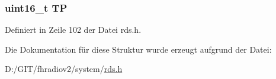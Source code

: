 \subsubsection[{T\+P}]{\setlength{\rightskip}{0pt plus 5cm}uint16\+\_\+t T\+P}\label{structgroup__2b_ab9e634c63b0d95a96716d5f6d7f06d72}


Definiert in Zeile 102 der Datei rds.\+h.



Die Dokumentation für diese Struktur wurde erzeugt aufgrund der Datei\+:\begin{DoxyCompactItemize}
\item 
D\+:/\+G\+I\+T/fhradiov2/system/\hyperlink{rds_8h}{rds.\+h}\end{DoxyCompactItemize}
